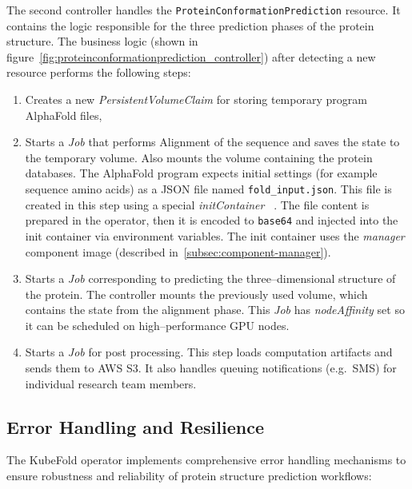 The second controller handles the \texttt{ProteinConformationPrediction} resource.
It contains the logic responsible for the three prediction phases of the protein structure.
The business logic (shown in figure~\ref{fig:proteinconformationprediction_controller}) after detecting a new resource performs the following steps:
\begin{enumerate}
    \item Creates a new \textit{PersistentVolumeClaim} for storing temporary program AlphaFold files,
    \item Starts a \textit{Job} that performs Alignment of the sequence and saves the state to the temporary volume.
    Also mounts the volume containing the protein databases.
    The AlphaFold program expects initial settings (for example sequence amino acids) as a JSON file named \texttt{fold\_input.json}.
    This file is created in this step using a special \textit{initContainer} ~\cite{k8s_init_containers}.
    The file content is prepared in the operator, then it is encoded to \texttt{base64} and injected into the init container via environment variables.
    The init container uses the \textit{manager} component image (described in~\ref{subsec:component-manager}).
    \item Starts a \textit{Job} corresponding to predicting the three--dimensional structure of the protein.
    The controller mounts the previously used volume, which contains the state from the alignment phase.
    This \textit{Job} has \textit{nodeAffinity} set so it can be scheduled on high--performance GPU nodes.
    \item Starts a \textit{Job} for post processing.
    This step loads computation artifacts and sends them to AWS S3. It also handles queuing notifications (e.g.\     SMS) for individual research team members.
\end{enumerate}

\subsection{Error Handling and Resilience}

The KubeFold operator implements comprehensive error handling mechanisms to ensure robustness and reliability of protein structure prediction workflows:

